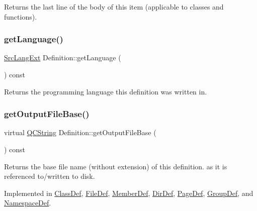 Returns the last line of the body of this item (applicable to classes and functions). \mbox{\label{class_definition_a3c214d451d86bf8994c9d1503ed2843d}} 
\subsubsection{\texorpdfstring{getLanguage()}{getLanguage()}}
{\footnotesize\ttfamily \mbox{\hyperlink{types_8h_a9974623ce72fc23df5d64426b9178bf2}{Src\+Lang\+Ext}} Definition\+::get\+Language (\begin{DoxyParamCaption}{ }\end{DoxyParamCaption}) const}

Returns the programming language this definition was written in. \mbox{\label{class_definition_acabecdc6bfda2015811eed5f3436322d}} 
\subsubsection{\texorpdfstring{getOutputFileBase()}{getOutputFileBase()}}
{\footnotesize\ttfamily virtual \mbox{\hyperlink{class_q_c_string}{Q\+C\+String}} Definition\+::get\+Output\+File\+Base (\begin{DoxyParamCaption}{ }\end{DoxyParamCaption}) const\hspace{0.3cm}{\ttfamily [pure virtual]}}

Returns the base file name (without extension) of this definition. as it is referenced to/written to disk. 

Implemented in \mbox{\hyperlink{class_class_def_a0031d083ee93ea5a0337051b4bc97719}{Class\+Def}}, \mbox{\hyperlink{class_file_def_a57496c4b5436110bd66fdfa1fee0eefe}{File\+Def}}, \mbox{\hyperlink{class_member_def_afafa6a560b69558c5d3c8bba0424c939}{Member\+Def}}, \mbox{\hyperlink{class_dir_def_a345c9c6a02715cf7d81315e4154a4a0d}{Dir\+Def}}, \mbox{\hyperlink{class_page_def_a7b72dba48ce4045351aed9a397ce9b0f}{Page\+Def}}, \mbox{\hyperlink{class_group_def_a6320c7b06b29937039549be13a698e20}{Group\+Def}}, and \mbox{\hyperlink{class_namespace_def_a7baf9b0abdda0393ab156d5a9eedf08f}{Namespace\+Def}}.

